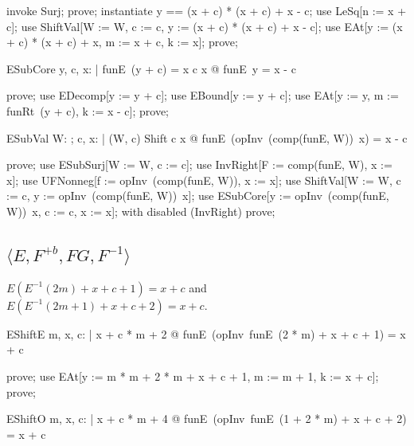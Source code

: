 \documentclass{article}
\begin{document}
\begin{zproof}
invoke Surj;
prove;
instantiate y == (x + c) * (x + c) + x - c;
use LeSq[n := x + c];
use ShiftVal[W := W, c := c, y := (x + c) * (x + c) + x - c];
use EAt[y := (x + c) * (x + c) + x, m := x + c, k := x];
prove;
\end{zproof}

\begin{theorem}{ESubCore}
  \forall y, c, x: \nat | funE~(y + c) = x \land c \leq x @ funE~y = x - c
\end{theorem}

\begin{zproof}
prove;
use EDecomp[y := y + c];
use EBound[y := y + c];
use EAt[y := y, m := funRt~(y + c), k := x - c];
prove;
\end{zproof}

\begin{theorem}{ESubVal}
  \forall W: \nat \fun \nat; c, x: \nat | (W, c) \in Shift \land c \leq x @ funE~(opInv~(comp(funE, W))~x) = x - c
\end{theorem}

\begin{zproof}
prove;
use ESubSurj[W := W, c := c];
use InvRight[F := comp(funE, W), x := x];
use UFNonneg[f := opInv~(comp(funE, W)), x := x];
use ShiftVal[W := W, c := c, y := opInv~(comp(funE, W))~x];
use ESubCore[y := opInv~(comp(funE, W))~x, c := c, x := x];
with disabled (InvRight) prove;
\end{zproof}


\subsection{$\langle E, F^{+b}, FG, F^{-1}\rangle$}

$E(E^{-1}(2m) + x + c + 1) = x + c$ and $E(E^{-1}(2m + 1) + x + c + 2) = x + c$.

\begin{theorem}{EShiftE}
  \forall m, x, c: \nat | x + c  * m + 2 @ funE~(opInv~funE~(2 * m) + x + c + 1) = x + c
\end{theorem}

\begin{zproof}
prove;
use EAt[y := m * m + 2 * m + x + c + 1, m := m + 1, k := x + c];
prove;
\end{zproof}

\begin{theorem}{EShiftO}
  \forall m, x, c: \nat | x + c  * m + 4 @ funE~(opInv~funE~(1 + 2 * m) + x + c + 2) = x + c
\end{theorem}
\end{document}
